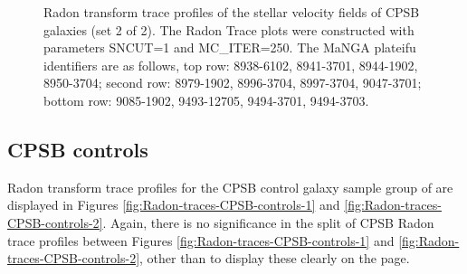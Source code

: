 \documentclass[fleqn,usenatbib]{mnras}
\begin{document}
\begin{figure}
    \caption{Radon transform trace profiles of the stellar velocity fields of CPSB galaxies (set 2 of 2). The Radon Trace plots were constructed with parameters SNCUT=1 and MC\_ITER=250. The MaNGA plateifu identifiers are as follows, top row: 8938-6102, 8941-3701, 8944-1902, 8950-3704; second row: 8979-1902, 8996-3704, 8997-3704, 9047-3701; bottom row: 9085-1902, 9493-12705, 9494-3701, 9494-3703.}
    \label{fig:Radon-traces-CPSBs-2-SN1-MC250}
\end{figure}


\subsection{CPSB controls}
Radon transform trace profiles for the CPSB control galaxy sample group of are displayed in Figures \ref{fig:Radon-traces-CPSB-controls-1} and \ref{fig:Radon-traces-CPSB-controls-2}. Again, there is no significance in the split of CPSB Radon trace profiles between Figures \ref{fig:Radon-traces-CPSB-controls-1} and \ref{fig:Radon-traces-CPSB-controls-2}, other than to display these clearly on the page.
\end{document}
